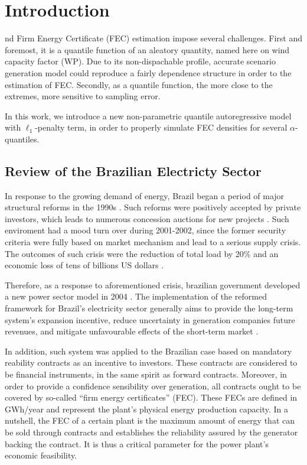 \documentclass[a4paper]{IEEEtran}
\begin{document}

\section{Introduction}
nd Firm Energy Certificate (FEC) estimation impose several challenges. First and foremost, it is a quantile function of an aleatory quantity, named here on wind capacity factor (WP). Due to its non-dispachable profile, accurate scenario generation model could reproduce a fairly dependence structure in order to the estimation of FEC. Secondly, as a quantile function, the more close to the extremes, more sensitive to sampling error.

In this work, we introduce a new non-parametric quantile autoregressive model with $\ell_{1}$-penalty term, in order to properly simulate FEC densities for several $\alpha$-quantiles. 


\subsection{Review of the Brazilian Electricty Sector}
In response to the growing demand of energy, Brazil began a period of major structural reforms in the 1990s \cite{portal13}. Such reforms were positively accepted by private investors, which leads to numerous concession auctions for new projects \cite{barroso06}. Such enviroment had a mood turn over during 2001-2002, since the former security criteria were fully based on market mechanism and lead to a serious supply crisis. The outcomes of such crisis were the reduction of total load by 20\% and an economic loss of tens of billions US dollars \cite{pereira04}.

Therefore, as a response to aforementioned crisis, brazilian government developed a new power sector model in 2004 \cite{barroso06}. The implementation of the reformed framework for Brazil's electricity sector generally aims to provide the long-term system's expansion incentive, reduce uncertainty in generation companies future revenues, and mitigate unfavourable effects of the short-term market \cite{street09}.

In addition, such system was applied to the Brazilian case based on mandatory reability contracts as an incentive to investors. These contracts are considered to be financial instruments, in the same spirit as forward contracts. Moreover, in order to provide a confidence sensibility over generation, all contracts ought to be covered by so-called ``firm energy certificates'' (FEC). These FECs are defined in GWh/year and represent the plant's physical energy production capacity. In a nutshell, the FEC of a certain plant is the maximum amount of energy that can be sold through contracts and establishes the reliability assured by the generator backing the contract. It is thus a critical parameter for the power plant's economic feasibility.
\end{document}

